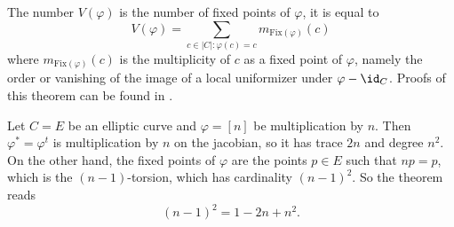 The number $V(\varphi)$ is the number of fixed points of $\varphi$, it is equal to 
$$
V(\varphi) = \sum_{c \in |C| : \varphi(c) = c} m_\text{Fix$(\varphi)$} (c)
$$
where $m_\text{Fix$(\varphi)$} (c)$ is the multiplicity of $c$ as a fixed point of $\varphi$, namely the order or vanishing of the image of a local uniformizer under $\varphi - \id_C$. Proofs of this theorem can be found in \cite{Lang, Weil}.

\begin{example}
Let $C = E$ be an elliptic curve and $\varphi = [n]$ be multiplication by $n$. Then $\varphi^* = \varphi^t$ is multiplication by $n$ on the jacobian, so it has trace $2n$ and degree $n^2$. On the other hand, the fixed points of $\varphi$ are the points $p \in E$ such that $n p = p$, which is the $(n-1)$-torsion, which has cardinality $(n-1)^2$. So the theorem reads
$$
(n-1)^2 = 1 - 2n + n^2.
$$
\end{example}


